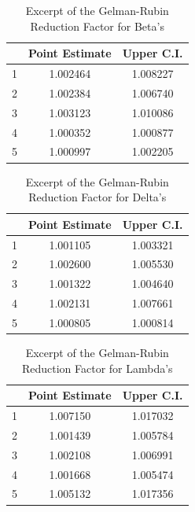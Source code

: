 \documentclass[twoside,onecolumn]{article}
\begin{document}
\begin{table}[ht]
\caption{Excerpt of the Gelman-Rubin Reduction Factor for Beta's} %
\centering %
\begin{tabular}{c c c} %
\hline\hline %
 & Point Estimate & Upper C.I. \\ [1ex] %
\hline %
1 & 1.002464 & 1.008227 \\ %
2 & 1.002384 & 1.006740 \\ 
3 & 1.003123 & 1.010086 \\
4 & 1.000352 & 1.000877 \\
5 & 1.000997 & 1.002205 \\ [1ex] %
\hline %
\end{tabular}
\label{table:gelman_beta_summary} %
\end{table}

\begin{table}[ht]
\caption{Excerpt of the Gelman-Rubin Reduction Factor for Delta's} %
\centering %
\begin{tabular}{c c c} %
\hline\hline %
 & Point Estimate & Upper C.I. \\ [1ex] %
\hline %
1 & 1.001105 & 1.003321 \\ %
2 & 1.002600 & 1.005530 \\ 
3 & 1.001322 & 1.004640 \\
4 & 1.002131 & 1.007661 \\
5 & 1.000805 & 1.000814 \\ [1ex] %
\hline %
\end{tabular}
\label{table:gelman_delta_summary} %
\end{table}

\begin{table}[ht]
\caption{Excerpt of the Gelman-Rubin Reduction Factor for Lambda's} %
\centering %
\begin{tabular}{c c c} %
\hline\hline %
 & Point Estimate & Upper C.I. \\ [1ex] %
\hline %
1 & 1.007150 & 1.017032 \\ %
2 & 1.001439 & 1.005784 \\ 
3 & 1.002108 & 1.006991 \\
4 & 1.001668 & 1.005474 \\
5 & 1.005132 & 1.017356 \\ [1ex] %
\hline %
\end{tabular}
\label{table:gelman_lambda_summary} %
\end{table}
\end{document}
